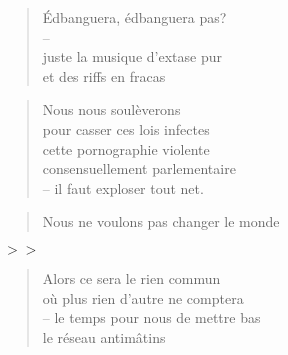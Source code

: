   \begin{verse}
    Édbanguera, édbanguera pas?\\
    -- \\
    juste la musique d’extase pur\\
    et des riffs en fracas
  \end{verse}
  \begin{verse}
    Nous nous soulèverons\\
    pour casser ces lois infectes\\
    cette pornographie violente\\
    consensuellement parlementaire\\
    -- il faut exploser tout net.
  \end{verse}
  \begin{verse}
    Nous ne voulons pas changer le monde
  \end{verse}
  \begin{center}
    \texttt{$>>$}
  \end{center}
  \begin{verse}
    Alors ce sera le rien commun\\
    où plus rien d’autre ne comptera\\
    -- le temps pour nous de mettre bas\\
    le réseau antimâtins
  \end{verse}
  \begin{verse}
  \end{verse}
